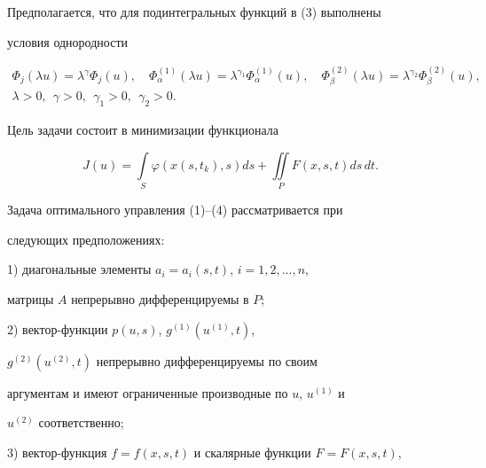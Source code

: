 Предполагается, что для подинтегральных функций в (3) выполнены


условия однородности


\begin{gather*}


\Phi_j (\lambda u) = \lambda^\gamma \Phi_j(u), \quad


\Phi^{(1)}_\alpha (\lambda u) = \lambda^{\gamma_1}


\Phi^{(1)}_\alpha (u), \quad \Phi^{(2)}_\beta (\lambda u) =


\lambda^{\gamma_2} \Phi^{(2)}_\beta (u), \\


\lambda > 0, \ \ \gamma > 0, \ \ \gamma_1 > 0, \ \


\gamma_2 > 0. 


\end{gather*}





Цель задачи состоит в минимизации функционала


\begin{equation}


J(u) =


\int\limits_S \varphi(x(s,t_k),s) ds + \iint\limits_P


F(x,s,t) ds\, dt.


\end{equation}





Задача оптимального управления (1)--(4) рассматривается при


следующих предположениях:





1) диагональные элементы $a_i=a_i(s,t)$, $i=1,2,\dotsc,n$,


матрицы $A$ непрерывно дифференцируемы в $P$;





2) вектор-функции $p(u,s)$, $g^{(1)}(u^{(1)},t)$,


$g^{(2)}(u^{(2)},t)$  непрерывно дифференцируемы по своим


аргументам и имеют ограниченные производные  по $u$, $u^{(1)}$ и


$u^{(2)}$ соответственно;





3) вектор-функция $f=f(x,s,t)$ и скалярные функции $F=F(x,s,t)$,


